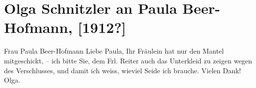 

         
         \renewcommand{\erwaehntePersonen}{Personen: Paula Beer-Hofmann, Maria Anna Cerino, Anna Reiter, Olga Schnitzler}
         \renewcommand{\erwaehnteOrte}{Orte: Wien}
         \renewcommand{\erwaehnteWerke}{}
               \section[Olga Schnitzler an Paula Beer-Hofmann, {[}1912?{]}]{ Olga Schnitzler an Paula Beer-Hofmann, {[}1912?{]}}\nopagebreak{}\rehead{ }\begin{ledgroupsized}[t]{13cm}\normalsize\beginnumbering \toendnotes[C]{\smallbreak\pagebreak[2]} 
\toendnotes[C]{\smallbreak}\pstart{}{\pb}Frau Paula Beer-Hofmann\pend{}{\bigskip}\pstart
           \noindent{}{\pb}Liebe Paula, Ihr Fräulein hat nur den Mantel
               mitgeschickt, – ich bitte Sie, dem Frl. Reiter
               auch das Unterkleid zu zeigen wegen des Verschlusses, und damit ich weiss, wieviel
               Seide {\pb}ich brauche.\pend
           \pstart
           Vielen Dank!\pend
           \pstart \spacefill\mbox{Olga.}\pend{}
         
         \endnumbering{}\end{ledgroupsized}  \newcommand{\dateiname}{L02566}\newcommand{\titel}{Olga Schnitzler an Paula Beer-Hofmann, [1912?]}\newcommand{\editorInnen}{Martin Anton Müller und Gerd-Hermann Susen}
      